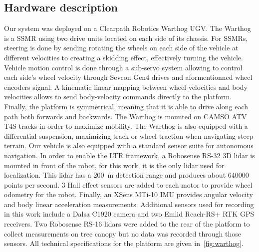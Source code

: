\subsection{Hardware description}
\label{sec:hardware}

Our system was deployed on a Clearpath Robotics Warthog \ac{UGV}.
The Warthog is a \ac{SSMR} using two drive units located on each side of its chassis.
For \acp{SSMR}, steering is done by sending rotating the wheels on each side of the vehicle at different velocities to creating a skidding effect, effectively turning the vehicle.
Vehicle motion control is done through a sub-servo system allowing to control each side's wheel velocity through Sevcon Gen4 drives and aformentionned wheel encoders signal.
A kinematic linear mapping between wheel velocities and body velocities allows to send body-velocity commands directly to the platform.
Finally, the platform is symmetrical, meaning that it is able to drive along each path both forwards and backwards.
The Warthog is mounted on CAMSO ATV T4S tracks in order to maximize mobility.
The Warthog is also equipped with a differential suspension, maximizing track or wheel traction when navigating steep terrain.
Our vehicle is also equipped with a standard sensor suite for autonomous navigation.
In order to enable the \ac{LTR} framework, a Robosense RS-32 3D lidar is mounted in front of the robot, for this work, it is the only lidar used for localization.
This lidar has a \SI{200}{m} detection range and produces about \SI{640000}{} points per second.
3 Hall effect sensors are added to each motor to provide wheel odometry for the robot.
Finally, an XSens MTi-10 \ac{IMU} provides angular velocity and body linear acceleration measurements.
Additional sensors used for recording in this work include a Dalsa C1920 camera and two Emlid Reach-RS+ \ac {RTK} \ac{GPS} receivers.
Two Robosense RS-16 lidars were added to the rear of the platform to collect measurements on tree canopy but no data was recorded through those sensors.
All technical specifications for the platform are given in~\autoref{fig:warthog}.

